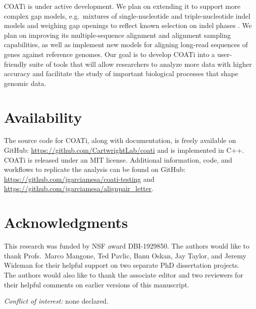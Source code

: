 \documentclass[12pt,letterpaper]{article}
\begin{document}
COATi is under active development. We plan on extending it to support more complex gap models, e.g.\ mixtures of single-nucleotide and triple-nucleotide indel models and weighing gap openings to reflect known selection on indel phases \citep{zhu2022profiling}. We plan on improving its multiple-sequence alignment and alignment sampling capabilities, as well as implement new models for aligning long-read sequences of genes against reference genomes. Our goal is to develop COATi into a user-friendly suite of tools that will allow researchers to analyze more data with higher accuracy and facilitate the study of important biological processes that shape genomic data.

\section*{Availability}
The source code for COATi, along with documentation, is freely available on GitHub: \url{https://github.com/CartwrightLab/coati} and is implemented in C++. COATi is released under an MIT license. Additional information, code, and workflows to replicate the analysis can be found on GitHub: \url{https://github.com/jgarciamesa/coati-testing} and \url{https://github.com/jgarciamesa/alignpair_letter}.


\section*{Acknowledgments}

This research was funded by NSF award DBI-1929850.
%
The authors would like to thank Profs.\ Marco Mangone, Ted Pavlic, Banu Oskan, Jay Taylor, and Jeremy Wideman for their helpful support on two separate PhD dissertation projects. The authors would also like to thank the associate editor and two reviewers for their helpful comments on earlier versions of this manuscript.

\noindent \textit{Conflict of interest:} none declared.

%
\setlength{\bibhang}{0pt}


\nolinenumbers
\end{document}
